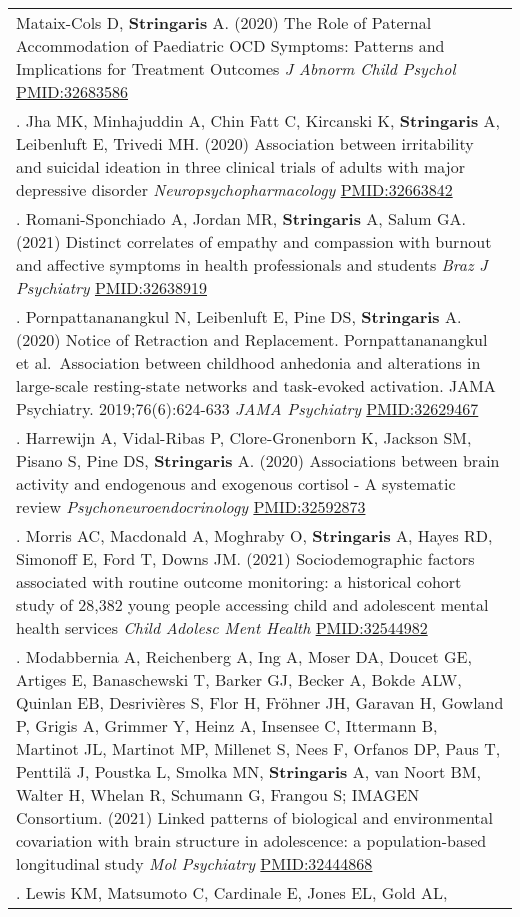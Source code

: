 \documentclass[
]{article}
\begin{document}
\begin{longtable}[]{@{}
  >{\raggedright\arraybackslash}p{}@{}}
Mataix-Cols D, \textbf{Stringaris} A. (2020) The Role of Paternal
Accommodation of Paediatric OCD Symptoms: Patterns and Implications for
Treatment Outcomes \emph{J Abnorm Child Psychol} \url{PMID:32683586} \\
67. Jha MK, Minhajuddin A, Chin Fatt C, Kircanski K, \textbf{Stringaris}
A, Leibenluft E, Trivedi MH. (2020) Association between irritability and
suicidal ideation in three clinical trials of adults with major
depressive disorder \emph{Neuropsychopharmacology}
\url{PMID:32663842} \\
68. Romani-Sponchiado A, Jordan MR, \textbf{Stringaris} A, Salum GA.
(2021) Distinct correlates of empathy and compassion with burnout and
affective symptoms in health professionals and students \emph{Braz J
Psychiatry} \url{PMID:32638919} \\
69. Pornpattananangkul N, Leibenluft E, Pine DS, \textbf{Stringaris} A.
(2020) Notice of Retraction and Replacement. Pornpattananangkul et
al.~Association between childhood anhedonia and alterations in
large-scale resting-state networks and task-evoked activation. JAMA
Psychiatry. 2019;76(6):624-633 \emph{JAMA Psychiatry}
\url{PMID:32629467} \\
70. Harrewijn A, Vidal-Ribas P, Clore-Gronenborn K, Jackson SM, Pisano
S, Pine DS, \textbf{Stringaris} A. (2020) Associations between brain
activity and endogenous and exogenous cortisol - A systematic review
\emph{Psychoneuroendocrinology} \url{PMID:32592873} \\
71. Morris AC, Macdonald A, Moghraby O, \textbf{Stringaris} A, Hayes RD,
Simonoff E, Ford T, Downs JM. (2021) Sociodemographic factors associated
with routine outcome monitoring: a historical cohort study of 28,382
young people accessing child and adolescent mental health services
\emph{Child Adolesc Ment Health} \url{PMID:32544982} \\
72. Modabbernia A, Reichenberg A, Ing A, Moser DA, Doucet GE, Artiges E,
Banaschewski T, Barker GJ, Becker A, Bokde ALW, Quinlan EB, Desrivières
S, Flor H, Fröhner JH, Garavan H, Gowland P, Grigis A, Grimmer Y, Heinz
A, Insensee C, Ittermann B, Martinot JL, Martinot MP, Millenet S, Nees
F, Orfanos DP, Paus T, Penttilä J, Poustka L, Smolka MN,
\textbf{Stringaris} A, van Noort BM, Walter H, Whelan R, Schumann G,
Frangou S; IMAGEN Consortium. (2021) Linked patterns of biological and
environmental covariation with brain structure in adolescence: a
population-based longitudinal study \emph{Mol Psychiatry}
\url{PMID:32444868} \\
73. Lewis KM, Matsumoto C, Cardinale E, Jones EL, Gold AL,

\end{longtable}
\end{document}
